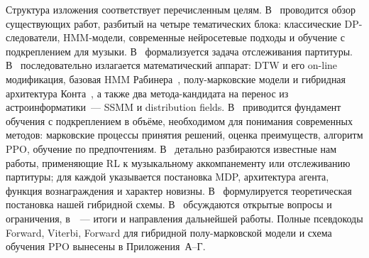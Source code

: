 Структура изложения соответствует перечисленным целям.
В~ проводится обзор существующих
работ, разбитый на четыре тематических блока: классические
DP-следователи, HMM-модели, современные нейросетевые подходы и
обучение с подкреплением для музыки. В~
формализуется задача отслеживания партитуры. В~
последовательно излагается математический аппарат: DTW и его
on-line модификация, базовая HMM Рабинера~\cite{Rabiner1989},
полу-марковские модели и гибридная архитектура
Конта~\cite{Cont2010}, а также два метода-кандидата на
перенос из астроинформатики~--- SSMM и distribution fields.
В~ приводится фундамент обучения с подкреплением
в объёме, необходимом для понимания современных методов:
марковские процессы принятия решений, оценка преимуществ,
алгоритм PPO, обучение по предпочтениям. В~
детально разбираются известные нам работы, применяющие RL к
музыкальному аккомпанементу или отслеживанию партитуры; для
каждой указывается постановка MDP, архитектура агента,
функция вознаграждения и характер новизны. В~
формулируется теоретическая постановка нашей гибридной схемы.
В~ обсуждаются открытые вопросы и
ограничения, в~~--- итоги и направления
дальнейшей работы. Полные псевдокоды Forward, Viterbi,
Forward для гибридной полу-марковской модели и схема обучения
PPO вынесены в Приложения~А--Г.

